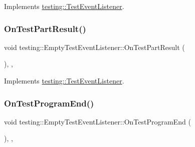 Implements \hyperlink{classtesting_1_1TestEventListener_a60cc09b7907cb329d152eb5e7133bdeb}{testing\+::\+Test\+Event\+Listener}.

\mbox{\label{classtesting_1_1EmptyTestEventListener_ab95992f0a0b3741d59a24c3a7115fa60}} 
\subsubsection{\texorpdfstring{On\+Test\+Part\+Result()}{OnTestPartResult()}}
{\footnotesize\ttfamily void testing\+::\+Empty\+Test\+Event\+Listener\+::\+On\+Test\+Part\+Result (\begin{DoxyParamCaption}\item[{const Test\+Part\+Result \&}]{ }\end{DoxyParamCaption})\hspace{0.3cm}{\ttfamily [inline]}, {\ttfamily [override]}, {\ttfamily [virtual]}}



Implements \hyperlink{classtesting_1_1TestEventListener_a054f8705c883fa120b91473aff38f2ee}{testing\+::\+Test\+Event\+Listener}.

\mbox{\label{classtesting_1_1EmptyTestEventListener_aaa9d683e8e0c850af67a0b92d785ddb9}} 
\subsubsection{\texorpdfstring{On\+Test\+Program\+End()}{OnTestProgramEnd()}}
{\footnotesize\ttfamily void testing\+::\+Empty\+Test\+Event\+Listener\+::\+On\+Test\+Program\+End (\begin{DoxyParamCaption}\item[{const \hyperlink{classtesting_1_1UnitTest}{Unit\+Test} \&}]{ }\end{DoxyParamCaption})\hspace{0.3cm}{\ttfamily [inline]}, {\ttfamily [override]}, {\ttfamily [virtual]}}



